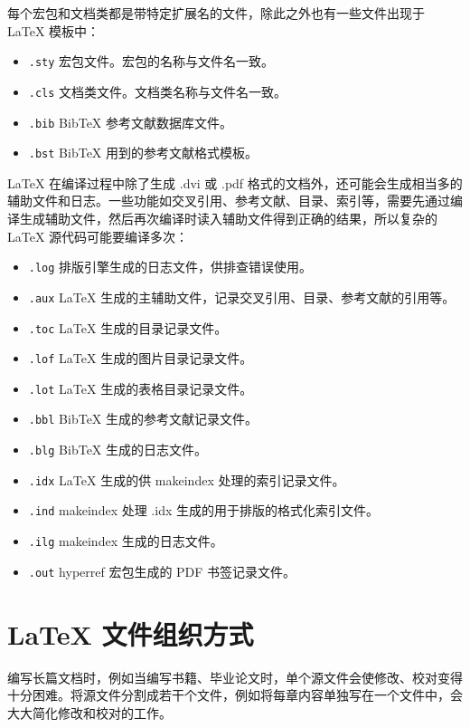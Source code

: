 每个宏包和文档类都是带特定扩展名的文件，除此之外也有一些文件出现于 \LaTeX{} 模板中：

\begin{itemize}
    \item \lstinline{.sty} 宏包文件。宏包的名称与文件名一致。
    \item \lstinline{.cls} 文档类文件。文档类名称与文件名一致。
    \item \lstinline{.bib} BibTeX 参考文献数据库文件。
    \item \lstinline{.bst} BibTeX 用到的参考文献格式模板。
\end{itemize}

\LaTeX{} 在编译过程中除了生成 .dvi 或 .pdf 格式的文档外，还可能会生成相当多的辅助文件和日志。一些功能如交叉引用、参考文献、目录、索引等，需要先通过编译生成辅助文件，然后再次编译时读入辅助文件得到正确的结果，所以复杂的 \LaTeX{} 源代码可能要编译多次：

\begin{itemize}
    \item \lstinline{.log} 排版引擎生成的日志文件，供排查错误使用。
    \item \lstinline{.aux} \LaTeX{} 生成的主辅助文件，记录交叉引用、目录、参考文献的引用等。
    \item \lstinline{.toc} \LaTeX{} 生成的目录记录文件。
    \item \lstinline{.lof} \LaTeX{} 生成的图片目录记录文件。
    \item \lstinline{.lot} \LaTeX{} 生成的表格目录记录文件。
    \item \lstinline{.bbl} BibTeX 生成的参考文献记录文件。
    \item \lstinline{.blg} BibTeX 生成的日志文件。
    \item \lstinline{.idx} \LaTeX{} 生成的供 makeindex 处理的索引记录文件。
    \item \lstinline{.ind} makeindex 处理 .idx 生成的用于排版的格式化索引文件。
    \item \lstinline{.ilg} makeindex 生成的日志文件。
    \item \lstinline{.out} hyperref 宏包生成的 PDF 书签记录文件。
\end{itemize}

\section{\LaTeX{} 文件组织方式}\label{sec:latexfileorganization}

编写长篇文档时，例如当编写书籍、毕业论文时，单个源文件会使修改、校对变得十分困难。将源文件分割成若干个文件，例如将每章内容单独写在一个文件中，会大大简化修改和校对的工作。

